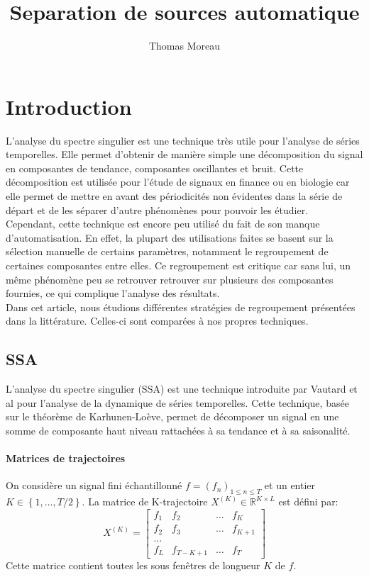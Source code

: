 \documentclass{gretsi}
\title{Separation de sources automatique}
\author{Thomas Moreau}
\date{}
\begin{document}
\maketitle


\section{Introduction}

L'analyse du spectre singulier est une technique très utile pour l'analyse de séries temporelles. Elle permet d'obtenir de manière simple une décomposition du signal en composantes de tendance, composantes oscillantes et bruit. Cette décomposition est utilisée pour l'étude de signaux en finance ou en biologie car elle permet de mettre en avant des périodicités non évidentes dans la série de départ et de les séparer d'autre phénomènes pour pouvoir les étudier.\\


Cependant, cette technique est encore peu utilisé du fait de son manque d'automatisation. En effet, la plupart des utilisations faites se basent sur la sélection manuelle de certains paramètres, notamment le regroupement de certaines composantes entre elles. Ce regroupement est critique car sans lui, un même phénomène peu se retrouver retrouver sur plusieurs des composantes fournies, ce qui complique l'analyse des résultats.\\

Dans cet article, nous étudions différentes stratégies de regroupement présentées dans la littérature. Celles-ci sont comparées à nos propres techniques.

\subsection{SSA}

L'analyse du spectre singulier (SSA) est une technique introduite par Vautard et al \cite{vautard_ghil_89_SSA} pour l'analyse de la dynamique de séries temporelles. Cette technique, basée sur le théorème de Karhunen-Loève, permet de décomposer un signal en une somme de composante haut niveau rattachées à sa tendance et à sa saisonalité.

\paragraph{Matrices de trajectoires}

On considère un signal fini échantillonné $f = (f_n)_{1 \le n\le T}$ et un entier $K \in \left \{ 1, \dots, T/2 \right \}$. La matrice de K-trajectoire $X^{(K)} \in \mathbb{R}^{K\times L}$ est défini par:
$$ X^{(K)} = \begin{bmatrix}
	f_1 & f_2 &\dots & f_K\\
	f_2 & f_3 &\dots & f_{K+1}\\
	\dots\\
	f_{L} & f_{T-K+1} &\dots & f_T
\end{bmatrix}$$
Cette matrice contient toutes les sous fenêtres de longueur $K$ de $f$.\\
\end{document}
